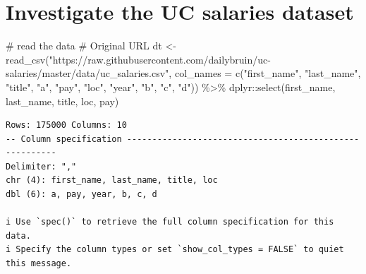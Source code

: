 \documentclass[
  letterpaper,
  DIV=11,
  numbers=noendperiod]{scrreprt}
\newenvironment{Shaded}{\begin{snugshade}}{\end{snugshade}}
\newcommand{\AttributeTok}[1]{\textcolor[rgb]{0.40,0.45,0.13}{#1}}
\newcommand{\CommentTok}[1]{\textcolor[rgb]{0.37,0.37,0.37}{#1}}
\newcommand{\FunctionTok}[1]{\textcolor[rgb]{0.28,0.35,0.67}{#1}}
\newcommand{\NormalTok}[1]{\textcolor[rgb]{0.00,0.23,0.31}{#1}}
\newcommand{\OtherTok}[1]{\textcolor[rgb]{0.00,0.23,0.31}{#1}}
\newcommand{\SpecialCharTok}[1]{\textcolor[rgb]{0.37,0.37,0.37}{#1}}
\newcommand{\StringTok}[1]{\textcolor[rgb]{0.13,0.47,0.30}{#1}}
\begin{document}
\hypertarget{investigate-the-uc-salaries-dataset}{%
\section{Investigate the UC salaries
dataset}\label{investigate-the-uc-salaries-dataset}}

\begin{Shaded}
\begin{Highlighting}[]
\CommentTok{\# read the data}
\CommentTok{\# Original URL}
\NormalTok{dt }\OtherTok{\textless{}{-}} \FunctionTok{read\_csv}\NormalTok{(}\StringTok{"https://raw.githubusercontent.com/dailybruin/uc{-}salaries/master/data/uc\_salaries.csv"}\NormalTok{, }
\AttributeTok{col\_names =} \FunctionTok{c}\NormalTok{(}\StringTok{"first\_name"}\NormalTok{, }\StringTok{"last\_name"}\NormalTok{, }\StringTok{"title"}\NormalTok{, }\StringTok{"a"}\NormalTok{, }\StringTok{"pay"}\NormalTok{, }\StringTok{"loc"}\NormalTok{, }\StringTok{"year"}\NormalTok{, }\StringTok{"b"}\NormalTok{, }\StringTok{"c"}\NormalTok{, }\StringTok{"d"}\NormalTok{)) }\SpecialCharTok{\%\textgreater{}\%}\NormalTok{  dplyr}\SpecialCharTok{::}\FunctionTok{select}\NormalTok{(first\_name, last\_name, title, loc, pay)}
\end{Highlighting}
\end{Shaded}

\begin{verbatim}
Rows: 175000 Columns: 10
-- Column specification --------------------------------------------------------
Delimiter: ","
chr (4): first_name, last_name, title, loc
dbl (6): a, pay, year, b, c, d

i Use `spec()` to retrieve the full column specification for this data.
i Specify the column types or set `show_col_types = FALSE` to quiet this message.
\end{verbatim}
\end{document}
